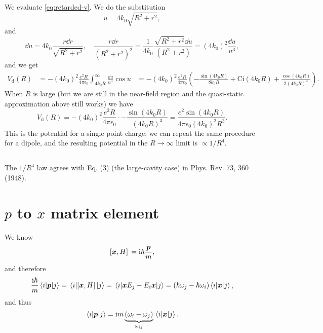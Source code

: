 \documentclass[hyperref, a4paper]{article}
\newcommand*{\ii}{\mathrm{i}}
\def\\{}%
\begin{document}
We evaluate \eqref{eq:retarded-v}. 
We do the substitution 
\begin{equation}
    u = 4 k_0 \sqrt{R^2 + r^2},
\end{equation}
and 
\[
    \dd{u} = 4k_0 \frac{r \dd{r}}{\sqrt{R^2 + r^2}} , \quad 
    \frac{r \dd{r}}{(R^2 + r^2)^2}
    = \frac{1}{4 k_0} \frac{\sqrt{R^2 + r^2} \dd{u}}{(R^2 + r^2)}
    = (4 k_0)^2 \frac{\dd{u}}{u^3},
\]
and we get 
\begin{equation}
    \begin{aligned}
        V_{\text{d}}(R) &= - (4 k_0)^2 \frac{e^2 R}{4 \pi \epsilon_0} 
        \int_{4 k_0 R}^{\infty}  \frac{\dd{u}}{u^3} \cos u \\
        &= - (4 k_0)^2 \frac{e^2 R}{4 \pi \epsilon_0} \left(
            - \frac{\sin (4k_0 R)}{8 k_0 R} + \mathrm{Ci}(4 k_0 R)
            + \frac{\cos (4 k_0 R)}{2 (4 k_0 R)^2}
        \right) .
    \end{aligned}
\end{equation}
When $R$ is large (but we are still in the near-field region 
and the quasi-static approximation above still works) 
we have 
\begin{equation}
    V_{\text{d}}(R) = - (4 k_0)^2 \frac{e^2 R}{4 \pi \epsilon_0}  \cdot 
    - \frac{\sin (4 k_0 R)}{(4 k_0 R)^3}
    = \frac{e^2 \sin (4 k_0 R)}{4 \pi \epsilon_0 (4 k_0)^2 R^3}.
\end{equation}
This is the potential for a single point charge;
we can repeat the same procedure for a dipole,
and the resulting potential in the $R \to \infty$ limit is $\propto 1/R^4$.

\subsection{}

The $1 / R^4$ law agrees with Eq. (3) (the large-cavity case) in Phys. Rev. 73, 360 (1948).

\section{$p$ to $x$ matrix element}

We know 
\begin{equation}
    \comm*{\vb*{x}}{H} = \ii \hbar \frac{\vb*{p}}{m},
\end{equation}
and therefore 
\[
    \frac{\ii \hbar}{m} \mel{i}{\vb*{p}}{j} = \mel{i}{\comm*{\vb*{x}}{H}}{j}
    = \mel{i}{\vb*{x} E_j - E_i \vb*{x}}{j}
    = (\hbar\omega_j - \hbar \omega_i) \mel{i}{\vb*{x}}{j},
\]
and thus 
\begin{equation}
    \mel{i}{\vb*{p}}{j} = \ii m \underbrace{(\omega_i - \omega_j)}_{\omega_{ij}} \mel{i}{\vb*{x}}{j}.
\end{equation}
\end{document}
